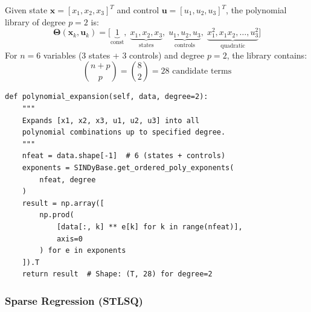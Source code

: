 \documentclass[11pt,a4paper]{article}
\begin{document}
\begin{equationbox}
Given state $\mathbf{x} = [x_1, x_2, x_3]^T$ and control $\mathbf{u} = [u_1, u_2, u_3]^T$,
the polynomial library of degree $p=2$ is:
\begin{equation}
    \bm{\Theta}(\mathbf{x}_k, \mathbf{u}_k) = \Big[\underbrace{1}_{\text{const}},\;
    \underbrace{x_1, x_2, x_3}_{\text{states}},\;
    \underbrace{u_1, u_2, u_3}_{\text{controls}},\;
    \underbrace{x_1^2, x_1 x_2, \ldots, u_3^2}_{\text{quadratic}}\Big]
    \label{eq:library}
\end{equation}
For $n=6$ variables (3 states + 3 controls) and degree $p=2$, the library contains:
\[
    \binom{n+p}{p} = \binom{8}{2} = 28 \text{ candidate terms}
\]
\end{equationbox}

\begin{codebox}
\begin{lstlisting}
def polynomial_expansion(self, data, degree=2):
    """
    Expands [x1, x2, x3, u1, u2, u3] into all
    polynomial combinations up to specified degree.
    """
    nfeat = data.shape[-1]  # 6 (states + controls)
    exponents = SINDyBase.get_ordered_poly_exponents(
        nfeat, degree
    )
    result = np.array([
        np.prod(
            [data[:, k] ** e[k] for k in range(nfeat)],
            axis=0
        ) for e in exponents
    ]).T
    return result  # Shape: (T, 28) for degree=2
\end{lstlisting}
\end{codebox}

\subsubsection{Sparse Regression (STLSQ)}
\end{document}
